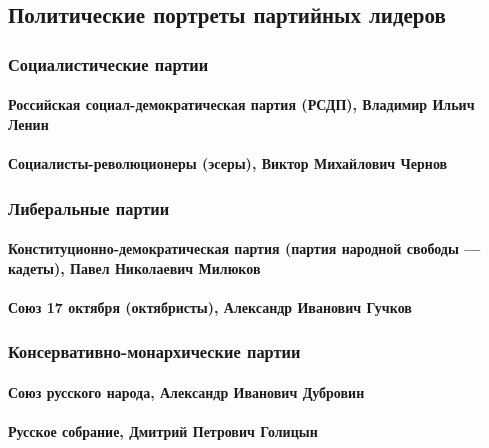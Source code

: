 \documentclass{article}
\begin{document}
\pagebreak
\subsection{Политические портреты партийных лидеров}

\subsubsection{Социалистические партии}

\paragraph{Российская социал-демократическая партия (РСДП), Владимир Ильич Ленин}

\paragraph{Социалисты-революционеры (эсеры), Виктор Михайлович Чернов}

\subsubsection{Либеральные партии}

\paragraph{Конституционно-демократическая партия (партия народной свободы — кадеты), Павел Николаевич Милюков}

\paragraph{Союз 17 октября (октябристы), Александр Иванович Гучков}

\subsubsection{Консервативно-монархические партии}

\paragraph{Союз русского народа, Александр Иванович Дубровин}

\paragraph{Русское собрание, Дмитрий Петрович Голицын}
\end{document}

